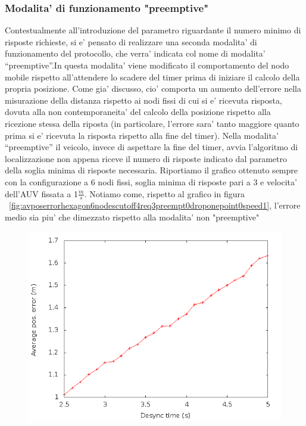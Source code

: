 \documentclass[Lau,binding=0.6cm]{sapthesis}
\begin{document}
\subsubsection{Modalita' di funzionamento "preemptive"}
Contestualmente all'introduzione del parametro riguardante il numero minimo di risposte richieste, si e' pensato di realizzare una seconda modalita' di funzionamento del protocollo, che verra' indicata col nome di modalita'  ``preemptive''.\newline In questa modalita' viene modificato il  comportamento del nodo mobile rispetto all'attendere lo scadere del timer prima di iniziare il calcolo della propria posizione. Come gia' discusso, cio' comporta un aumento dell'errore nella misurazione della distanza rispetto ai nodi fissi di cui si e' ricevuta risposta, dovuta alla non contemporaneita' del calcolo della posizione rispetto alla ricezione stessa della riposta (in particolare, l'errore sara' tanto maggiore quanto prima si e' ricevuta la risposta rispetto alla fine del timer).\newline
Nella modalita' ``preemptive'' il veicolo, invece di aspettare la fine del timer,  avvia l'algoritmo di localizzazione non appena riceve il numero di risposte indicato dal parametro della soglia minima di risposte necessaria.
Riportiamo il grafico ottenuto sempre con la configurazione a 6 nodi fissi, soglia minima di risposte pari a 3 e velocita' dell'AUV fissata a 1$\frac{m}{s}$. Notiamo come, rispetto al grafico in figura ~\ref{fig:avposerrorhexagon6nodescutoff4req3preempt0droponepoint0speed1}, l'errore medio sia piu' che dimezzato rispetto alla modalita' non "preemptive"
\begin{figure}[H]
    \includegraphics[scale=0.5]{avposerrorhexagon6nodescutoff4req3preempt1droponepoint0speed1.png}
    \centering
\end{figure}
\end{document}
